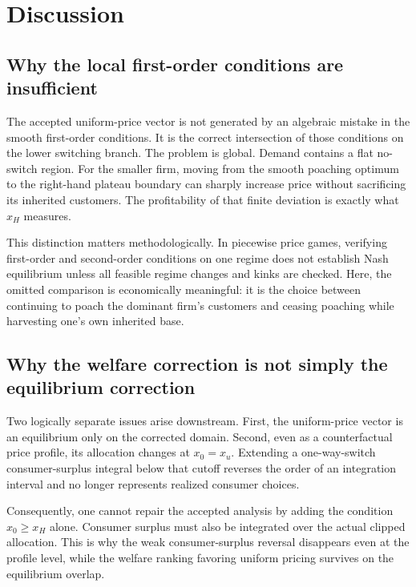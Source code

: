 \section{Discussion}
\label{sec:discussion}

\subsection{Why the local first-order conditions are insufficient}

The accepted uniform-price vector is not generated by an algebraic mistake in the smooth first-order conditions. It is the correct intersection of those conditions on the lower switching branch. The problem is global. Demand contains a flat no-switch region. For the smaller firm, moving from the smooth poaching optimum to the right-hand plateau boundary can sharply increase price without sacrificing its inherited customers. The profitability of that finite deviation is exactly what \(x_H\) measures.

This distinction matters methodologically. In piecewise price games, verifying first-order and second-order conditions on one regime does not establish Nash equilibrium unless all feasible regime changes and kinks are checked. Here, the omitted comparison is economically meaningful: it is the choice between continuing to poach the dominant firm's customers and ceasing poaching while harvesting one's own inherited base.

\subsection{Why the welfare correction is not simply the equilibrium correction}

Two logically separate issues arise downstream. First, the uniform-price vector is an equilibrium only on the corrected domain. Second, even as a counterfactual price profile, its allocation changes at \(x_0=x_u\). Extending a one-way-switch consumer-surplus integral below that cutoff reverses the order of an integration interval and no longer represents realized consumer choices.

Consequently, one cannot repair the accepted analysis by adding the condition \(x_0\ge x_H\) alone. Consumer surplus must also be integrated over the actual clipped allocation. This is why the weak consumer-surplus reversal disappears even at the profile level, while the welfare ranking favoring uniform pricing survives on the equilibrium overlap.

